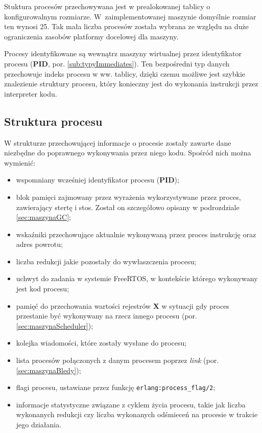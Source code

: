 Stuktura procesów przechowywana jest w prealokowanej tablicy o konfigurowalnym rozmiarze.
W~zaimplementowanej maszynie domyślnie rozmiar ten wynosi 25.
Tak mała liczba procesów została wybrana ze względu na duże ograniczenia zasobów platformy docelowej dla maszyny.

Procesy identyfikowane są wewnątrz maszyny wirtualnej przez identyfikator procesu (\textbf{PID}, por. \ref{sub:typyImmediates}).
Ten bezpośredni typ danych przechowuje indeks procesu w ww. tablicy, dzięki czemu możliwe jest szybkie znalezienie struktury procesu, który konieczny jest do wykonania instrukcji przez interpreter kodu.

\subsection{Struktura procesu}
\label{sub:procStruktura}

W strukturze przechowującej informacje o procesie zostały zawarte dane niezbędne do poprawnego wykonywania przez niego kodu.
Spośród nich można wymienić:
\begin{itemize}
\item wspomniany wcześniej identyfikator procesu (\textbf{PID});
\item blok pamięci zajmowany przez wyrażenia wykorzystywane przez proces, zawierający stertę i stos. Został on szczegółowo opisany w podrozdziale \ref{sec:maszynaGC};
\item wskaźniki przechowujące aktualnie wykonywaną przez proces instrukcję oraz adres powrotu;
\item liczba redukcji jakie pozostały do wywłaszczenia procesu;
\item uchwyt do zadania w systemie FreeRTOS, w kontekście którego wykonywany jest kod procesu;
\item pamięć do przechowania wartości rejestrów \textbf{X} w sytuacji gdy proces przestanie być wykonywany na rzecz innego procesu (por. \ref{sec:maszynaScheduler});
\item kolejka wiadomości, które zostały wysłane do procesu;
\item lista procesów połączonych z danym procesem poprzez \emph{link} (por. \ref{sec:maszynaBledy});
\item flagi procesu, ustawiane przez funkcję \texttt{erlang:process\_flag/2};
\item informacje statystyczne związane z cyklem życia procesu, takie jak liczba wykonanych redukcji czy liczba wykonanych odśmieceń na procesie w trakcie jego działania.
\end{itemize}

